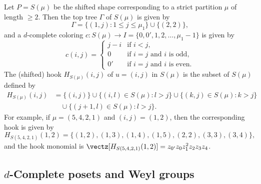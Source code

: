 \begin{exam}
\label{ex:shifted_hc}
Let $P = S(\mu)$ be the shifted shape corresponding to a strict partition $\mu$ of length $\ge 2$.
Then the top tree $\Gamma$ of $S(\mu)$ is given by
$$
\Gamma = \{ (1,j) : 1 \le j \le \mu_1 \} \cup \{ (2, 2) \},
$$
and a $d$-complete coloring $c : S(\mu) \to I = \{ 0, 0', 1, 2, \dots, \mu_1 - 1 \}$ is given by
$$
c(i,j)
 =
\begin{cases}
 j-i &\text{if $i < j$,} \\
 0 &\text{if $i=j$ and $i$ is odd,} \\
 0' &\text{if $i=j$ and $i$ is even.}
\end{cases}
$$
The (shifted) hook $H_{S(\mu)}(i,j)$ of $u = (i,j)$ in $S(\mu)$ is the subset of $S(\mu)$ defined by
\begin{align*}
H_{S(\mu)}(i,j)
 &=
\{ (i,j) \}
\cup
\{ (i,l) \in S(\mu) : l > j \}
\cup
\{ (k,j) \in S(\mu) : k > j \}
\\
&\quad
\cup
\{ (j+1,l) \in S(\mu) : l > j \}.
\end{align*}
For example, if $\mu = (5,4,2,1)$ and $(i,j) = (1,2)$, then the corresponding hook is given by
$$
H_{S(5,4,2,1)}(1,2)
 =
\{ (1,2), (1,3), (1,4), (1,5), (2,2), (3,3), (3,4) \},
$$
and the hook monomial is 
$\vectz[H_{S(5,4,2,1)}(1,2)]= z_{0'}z_{0} z_1^2 z_2 z_3 z_4$.
\end{exam}

\subsection{%
\texorpdfstring{$d$}{d}-Complete posets and Weyl groups
}\label{subsec2.2}

